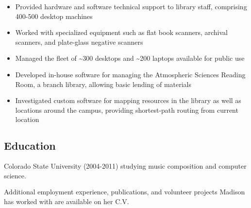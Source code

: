 \documentclass[letterpaper]{memoir}
\begin{document}
\begin{description}
    \begin{itemize}
        \tightlist
        \item
        Provided hardware and software technical support to library staff, comprising 400-500 desktop machines
        \item
        Worked with specialized equipment such as flat book scanners, archival scanners, and plate-glass negative scanners
        \item
        Managed the fleet of \textasciitilde{}300 desktops and \textasciitilde{}200 laptops available for public use
        \item
        Developed in-house software for managing the Atmospheric Sciences Reading Room, a branch library, allowing basic lending of materials
        \item
        Investigated custom software for mapping resources in the library as well as locations around the campus, providing shortest-path routing from current location
    \end{itemize}
\end{description}

\subsection{Education}\label{education}

\begin{description}
\tightlist
\item[University] \hfill
Colorado State University (2004-2011) studying music composition and
computer science.
\end{description}

Additional employment experience, publications, and volunteer projects
Madison has worked with are available on her C.V.
\end{document}
